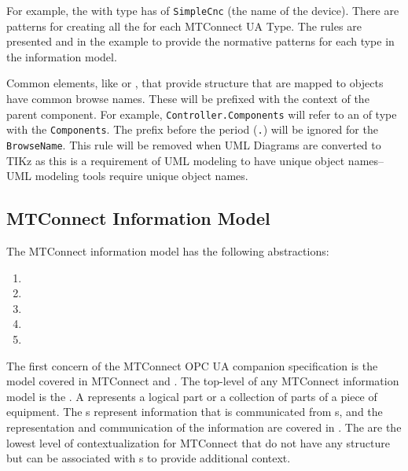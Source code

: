 For example, the with type  has  of \texttt{SimpleCnc} (the name of the device). There are patterns for creating all the  for each MTConnect UA Type. The rules are presented and in the example to provide the normative patterns for each type in the information model.

Common elements, like  or , that provide structure that are mapped to  objects have common browse names. These will be prefixed with the context of the parent component. For example, \texttt{Controller.Components} will refer to an  of type  with the  \texttt{Components}. The prefix before the period (\texttt{.}) will be ignored for the \texttt{BrowseName}. {\color{red} This rule will be removed when UML Diagrams are converted to TIKz as this is a requirement of UML modeling to have unique object names--UML modeling tools require unique object names.}

\FloatBarrier

\subsection{MTConnect Information Model}

The MTConnect information model has the following abstractions:

\begin{enumerate}
  \item {}
  \item {}
  \item {}
  \item {}
  \item {}
\end{enumerate}

The first concern of the MTConnect OPC UA companion specification is the  model covered in MTConnect \cite{MTCPart2} and \cite{MTCPart3}. The top-level  of any MTConnect information model is the . A  represents a logical part or a collection of parts of a piece of equipment. The s represent information that is communicated from s, and the representation and communication of the information are covered in \cite{MTCPart3}. The  are the lowest level of contextualization for MTConnect  that do not have any structure but can be associated with s to provide additional context. 

